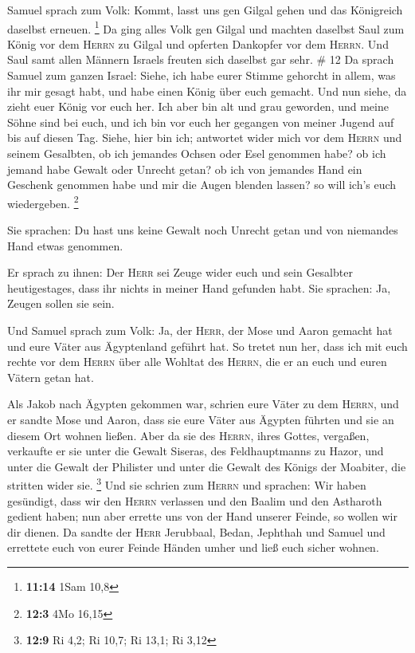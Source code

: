  Samuel sprach zum Volk: Kommt, lasst uns gen Gilgal
gehen und das Königreich daselbst erneuen. \footnote{\textbf{11:14} 1Sam
  10,8}  Da ging alles Volk gen Gilgal und machten
daselbst Saul zum König vor dem \textsc{Herrn} zu Gilgal und opferten
Dankopfer vor dem \textsc{Herrn}. Und Saul samt allen Männern Israels
freuten sich daselbst gar sehr. \# 12  Da sprach Samuel
zum ganzen Israel: Siehe, ich habe eurer Stimme gehorcht in allem, was
ihr mir gesagt habt, und habe einen König über euch gemacht.
 Und nun siehe, da zieht euer König vor euch her. Ich aber
bin alt und grau geworden, und meine Söhne sind bei euch, und ich bin
vor euch her gegangen von meiner Jugend auf bis auf diesen Tag.
 Siehe, hier bin ich; antwortet wider mich vor dem
\textsc{Herrn} und seinem Gesalbten, ob ich jemandes Ochsen oder Esel
genommen habe? ob ich jemand habe Gewalt oder Unrecht getan? ob ich von
jemandes Hand ein Geschenk genommen habe und mir die Augen blenden
lassen? so will ich's euch wiedergeben. \footnote{\textbf{12:3} 4Mo
  16,15}

 Sie sprachen: Du hast uns keine Gewalt noch Unrecht getan
und von niemandes Hand etwas genommen.

 Er sprach zu ihnen: Der \textsc{Herr} sei Zeuge wider
euch und sein Gesalbter heutigestages, dass ihr nichts in meiner Hand
gefunden habt. Sie sprachen: Ja, Zeugen sollen sie sein.

 Und Samuel sprach zum Volk: Ja, der \textsc{Herr}, der
Mose und Aaron gemacht hat und eure Väter aus Ägyptenland geführt hat.
 So tretet nun her, dass ich mit euch rechte vor dem
\textsc{Herrn} über alle Wohltat des \textsc{Herrn}, die er an euch und
euren Vätern getan hat.

 Als Jakob nach Ägypten gekommen war, schrien eure Väter
zu dem \textsc{Herrn}, und er sandte Mose und Aaron, dass sie eure Väter
aus Ägypten führten und sie an diesem Ort wohnen ließen. 
Aber da sie des \textsc{Herrn}, ihres Gottes, vergaßen, verkaufte er sie
unter die Gewalt Siseras, des Feldhauptmanns zu Hazor, und unter die
Gewalt der Philister und unter die Gewalt des Königs der Moabiter, die
stritten wider sie. \footnote{\textbf{12:9} Ri 4,2; Ri 10,7; Ri 13,1; Ri
  3,12}  Und sie schrien zum \textsc{Herrn} und sprachen:
Wir haben gesündigt, dass wir den \textsc{Herrn} verlassen und den
Baalim und den Astharoth gedient haben; nun aber errette uns von der
Hand unserer Feinde, so wollen wir dir dienen.  Da sandte
der \textsc{Herr} Jerubbaal, Bedan, Jephthah und Samuel und errettete
euch von eurer Feinde Händen umher und ließ euch sicher wohnen.


